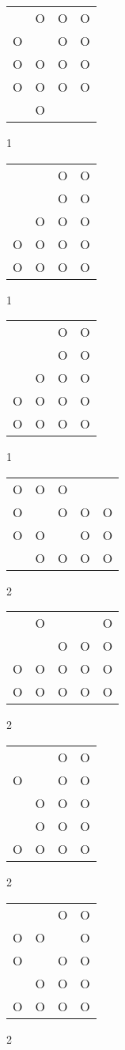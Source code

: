 \begin{tabular}{|m{0.2cm}m{0.2cm}m{0.2cm}m{0.2cm}|}\hline
 &O&O&O\\
O& &O&O\\
O&O&O&O\\
O&O&O&O\\
 &O& & \\
\hline\end{tabular}1
\begin{tabular}{|m{0.2cm}m{0.2cm}m{0.2cm}m{0.2cm}|}\hline
 & &O&O\\
 & &O&O\\
 &O&O&O\\
O&O&O&O\\
O&O&O&O\\
\hline\end{tabular}1
\begin{tabular}{|m{0.2cm}m{0.2cm}m{0.2cm}m{0.2cm}|}\hline
 & &O&O\\
 & &O&O\\
 &O&O&O\\
O&O&O&O\\
O&O&O&O\\
\hline\end{tabular}1
\begin{tabular}{|m{0.2cm}m{0.2cm}m{0.2cm}m{0.2cm}m{0.2cm}|}\hline
O&O&O& & \\
O& &O&O&O\\
O&O& &O&O\\
 &O&O&O&O\\
\hline\end{tabular}2
\begin{tabular}{|m{0.2cm}m{0.2cm}m{0.2cm}m{0.2cm}m{0.2cm}|}\hline
 &O& & &O\\
 & &O&O&O\\
O&O&O&O&O\\
O&O&O&O&O\\
\hline\end{tabular}2
\begin{tabular}{|m{0.2cm}m{0.2cm}m{0.2cm}m{0.2cm}|}\hline
 & &O&O\\
O& &O&O\\
 &O&O&O\\
 &O&O&O\\
O&O&O&O\\
\hline\end{tabular}2
\begin{tabular}{|m{0.2cm}m{0.2cm}m{0.2cm}m{0.2cm}|}\hline
 & &O&O\\
O&O& &O\\
O& &O&O\\
 &O&O&O\\
O&O&O&O\\
\hline\end{tabular}2
